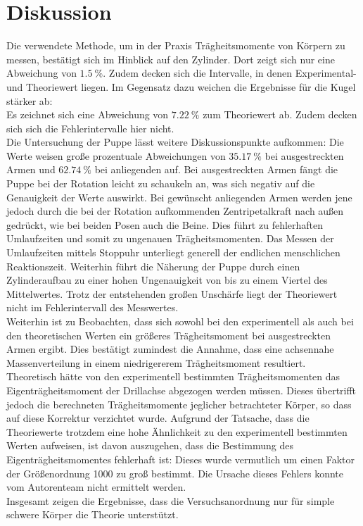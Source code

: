 \section{Diskussion}
\label{sec:Diskussion}
Die verwendete Methode, um in der Praxis Trägheitsmomente von Körpern zu messen, bestätigt sich im Hinblick auf den Zylinder.
Dort zeigt sich nur eine Abweichung von $\SI{1.5}{\percent}$.
Zudem decken sich die Intervalle, in denen Experimental- und Theoriewert liegen.
Im Gegensatz dazu weichen die Ergebnisse für die Kugel stärker ab:\\
Es zeichnet sich eine Abweichung von $\SI{7.22}{\percent}$ zum Theoriewert ab.
Zudem decken sich sich die Fehlerintervalle hier nicht.\\
Die Untersuchung der Puppe lässt weitere Diskussionspunkte aufkommen:
Die Werte weisen große prozentuale Abweichungen von $\SI{35.17}{\percent}$ bei ausgestreckten Armen und $\SI{62.74}{\percent}$ bei anliegenden auf.
Bei ausgestreckten Armen fängt die Puppe bei der Rotation leicht zu schaukeln an, was sich negativ auf die Genauigkeit der Werte auswirkt.
Bei gewünscht anliegenden Armen werden jene jedoch durch die bei der Rotation aufkommenden Zentripetalkraft nach außen gedrückt, wie bei beiden Posen auch die Beine.
Dies führt zu fehlerhaften Umlaufzeiten und somit zu ungenauen Trägheitsmomenten.
Das Messen der Umlaufzeiten mittels Stoppuhr unterliegt generell der endlichen menschlichen Reaktionszeit.
Weiterhin führt die Näherung der Puppe durch einen Zylinderaufbau zu einer hohen Ungenauigkeit von bis zu einem Viertel des Mittelwertes. Trotz der entstehenden großen Unschärfe liegt der Theoriewert nicht im Fehlerintervall des Messwertes. \\
Weiterhin ist zu Beobachten, dass sich sowohl bei den experimentell als auch bei den theoretischen Werten ein größeres Trägheitsmoment bei ausgestreckten Armen ergibt.
Dies bestätigt zumindest die Annahme, dass eine achsennahe Massenverteilung in einem niedrigererem Trägheitsmoment resultiert.\\
Theoretisch hätte von den experimentell bestimmten Trägheitsmomenten das Eigenträgheitsmoment der Drillachse abgezogen werden müssen.
Dieses übertrifft jedoch die berechneten Trägheitsmomente jeglicher betrachteter Körper, so dass auf diese Korrektur verzichtet wurde.
Aufgrund der Tatsache, dass die Theoriewerte trotzdem eine hohe Ähnlichkeit zu den experimentell bestimmten Werten aufweisen, ist davon auszugehen, dass die Bestimmung des Eigenträgheitsmomentes fehlerhaft ist:
Dieses wurde vermutlich um einen Faktor der Größenordnung 1000 zu groß bestimmt.
Die Ursache dieses Fehlers konnte vom Autorenteam nicht ermittelt werden.\\
Insgesamt zeigen die Ergebnisse, dass die Versuchsanordnung nur für simple schwere Körper die Theorie unterstützt.
